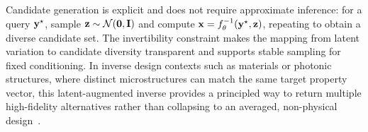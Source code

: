 Candidate generation is explicit and does not require approximate inference: for a query $\mathbf{y}^\star$, sample $\mathbf{z}\sim \mathcal{N}(\mathbf{0},\mathbf{I})$ and compute $\mathbf{x}=f_\theta^{-1}(\mathbf{y}^\star,\mathbf{z})$, repeating to obtain a diverse candidate set. The invertibility constraint makes the mapping from latent variation to candidate diversity transparent and supports stable sampling for fixed conditioning. In inverse design contexts such as materials or photonic structures, where distinct microstructures can match the same target property vector, this latent-augmented inverse provides a principled way to return multiple high-fidelity alternatives rather than collapsing to an averaged, non-physical design~\cite{Ardizzone2019INN}.







